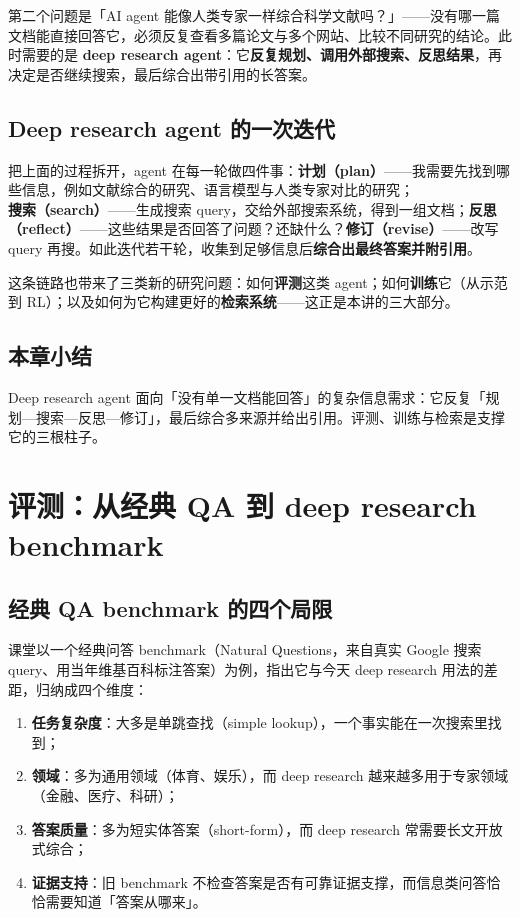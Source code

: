\documentclass[a4paper]{article}
\begin{document}
第二个问题是「AI agent 能像人类专家一样综合科学文献吗？」——没有哪一篇文档能直接回答它，必须反复查看多篇论文与多个网站、比较不同研究的结论。此时需要的是 \textbf{deep research agent}：它\textbf{反复规划、调用外部搜索、反思结果}，再决定是否继续搜索，最后综合出带引用的长答案。

\subsection{Deep research agent 的一次迭代}

把上面的过程拆开，agent 在每一轮做四件事：\textbf{计划（plan）}——我需要先找到哪些信息，例如文献综合的研究、语言模型与人类专家对比的研究；\textbf{搜索（search）}——生成搜索 query，交给外部搜索系统，得到一组文档；\textbf{反思（reflect）}——这些结果是否回答了问题？还缺什么？\textbf{修订（revise）}——改写 query 再搜。如此迭代若干轮，收集到足够信息后\textbf{综合出最终答案并附引用}。

这条链路也带来了三类新的研究问题：如何\textbf{评测}这类 agent；如何\textbf{训练}它（从示范到 RL）；以及如何为它构建更好的\textbf{检索系统}——这正是本讲的三大部分。

\subsection{本章小结}
Deep research agent 面向「没有单一文档能回答」的复杂信息需求：它反复「规划—搜索—反思—修订」，最后综合多来源并给出引用。评测、训练与检索是支撑它的三根柱子。

\section{评测：从经典 QA 到 deep research benchmark}

\subsection{经典 QA benchmark 的四个局限}

课堂以一个经典问答 benchmark（Natural Questions，来自真实 Google 搜索 query、用当年维基百科标注答案）为例，指出它与今天 deep research 用法的差距，归纳成四个维度：

\begin{enumerate}
\item \textbf{任务复杂度}：大多是单跳查找（simple lookup），一个事实能在一次搜索里找到；
\item \textbf{领域}：多为通用领域（体育、娱乐），而 deep research 越来越多用于专家领域（金融、医疗、科研）；
\item \textbf{答案质量}：多为短实体答案（short-form），而 deep research 常需要长文开放式综合；
\item \textbf{证据支持}：旧 benchmark 不检查答案是否有可靠证据支撑，而信息类问答恰恰需要知道「答案从哪来」。
\end{enumerate}
\end{document}
